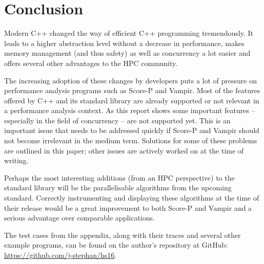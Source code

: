 \section{Conclusion}

Modern C++ changed the way of efficient C++ programming tremendously. It leads to a higher abstraction level without a decrease in performance, makes memory management (and thus safety) as well as concurrency a lot easier and offers several other advantages to the HPC community.

The increasing adoption of these changes by developers puts a lot of pressure on performance analysis programs such as Score-P and Vampir. Most of the features offered by C++ and its standard library are already supported or not relevant in a performance analysis context. As this report shows some important features -- especially in the field of concurrency -- are not supported yet. This is an important issue that needs to be addressed quickly if Score-P and Vampir should not become irrelevant in the medium term. Solutions for some of these problems are outlined in this paper; other issues are actively worked on at the time of writing.

Perhaps the most interesting additions (from an HPC perspective) to the standard library will be the parallelisable algorithms from the upcoming standard. Correctly instrumenting and displaying these algorithms at the time of their release would be a great improvement to both Score-P and Vampir and a serious advantage over comparable applications.

The test cases from the appendix, along with their traces and several other example programs, can be found on the author's repository at GitHub: \url{https://github.com/j-stephan/hs16}.